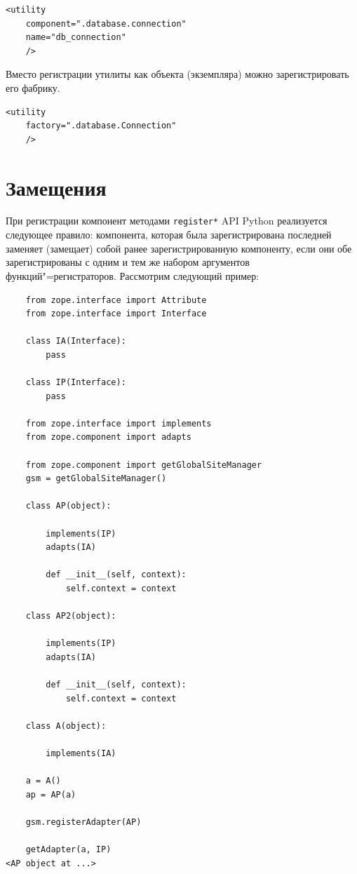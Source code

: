 \documentclass[a4paper,openany,twoside,final]{book}
\begin{document}
\begin{verbatim}
<utility
    component=".database.connection"
    name="db_connection"
    />
\end{verbatim}

Вместо регистрации утилиты как объекта (экземпляра) можно зарегистрировать его фабрику.

\begin{verbatim}
<utility
    factory=".database.Connection"
    />
\end{verbatim}


\section{Замещения%
  \label{id48}%
}

При регистрации компонент методами \texttt{register*} API Python реализуется следующее правило: компонента, которая была зарегистрирована последней заменяет (замещает) собой ранее зарегистрированную компоненту, если они обе зарегистрированы с одним и тем же набором аргументов функций"=регистраторов.  Рассмотрим следующий пример:

\begin{verbatim}
    from zope.interface import Attribute
    from zope.interface import Interface

    class IA(Interface):
        pass

    class IP(Interface):
        pass

    from zope.interface import implements
    from zope.component import adapts

    from zope.component import getGlobalSiteManager
    gsm = getGlobalSiteManager()

    class AP(object):

        implements(IP)
        adapts(IA)

        def __init__(self, context):
            self.context = context

    class AP2(object):

        implements(IP)
        adapts(IA)

        def __init__(self, context):
            self.context = context

    class A(object):

        implements(IA)

    a = A()
    ap = AP(a)

    gsm.registerAdapter(AP)

    getAdapter(a, IP)
<AP object at ...>
\end{verbatim}
\end{document}
